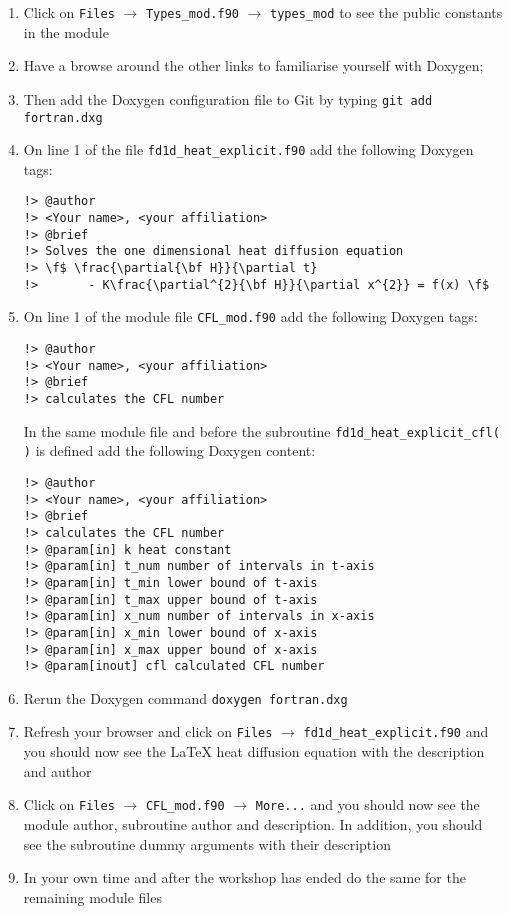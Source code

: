\documentclass[12pt]{article}
\begin{document}
\begin{enumerate}
\begin{enumerate}
\item Click on \texttt{Files} $\rightarrow$ \texttt{Types\_mod.f90} $\rightarrow$ \texttt{types\_mod} to see
the public constants in the module
\item Have a browse around the other links to familiarise yourself with Doxygen;
\item Then add the Doxygen configuration file to Git by typing \texttt{git add fortran.dxg}
\item On line 1 of the file \texttt{fd1d\_heat\_explicit.f90} add the following Doxygen tags:
\begin{verbatim}
!> @author
!> <Your name>, <your affiliation>
!> @brief 
!> Solves the one dimensional heat diffusion equation
!> \f$ \frac{\partial{\bf H}}{\partial t} 
!>       - K\frac{\partial^{2}{\bf H}}{\partial x^{2}} = f(x) \f$
\end{verbatim}
\item On line 1 of the module file \texttt{CFL\_mod.f90} add the following Doxygen tags:
\begin{verbatim}
!> @author
!> <Your name>, <your affiliation>
!> @brief
!> calculates the CFL number
\end{verbatim}
In the same module file and before the subroutine \texttt{fd1d\_heat\_explicit\_cfl( )} is defined add
the following Doxygen content:
\begin{verbatim}
!> @author
!> <Your name>, <your affiliation>
!> @brief
!> calculates the CFL number
!> @param[in] k heat constant
!> @param[in] t_num number of intervals in t-axis
!> @param[in] t_min lower bound of t-axis
!> @param[in] t_max upper bound of t-axis
!> @param[in] x_num number of intervals in x-axis
!> @param[in] x_min lower bound of x-axis
!> @param[in] x_max upper bound of x-axis
!> @param[inout] cfl calculated CFL number
\end{verbatim}
\item Rerun the Doxygen command \texttt{doxygen fortran.dxg}
\item Refresh your browser and click on \texttt{Files} $\rightarrow$ \texttt{fd1d\_heat\_explicit.f90} and you
should now see the LaTeX heat diffusion equation with the description and author
\item Click on \texttt{Files} $\rightarrow$ \texttt{CFL\_mod.f90} $\rightarrow$ \texttt{More...} and you 
should now see the module author, subroutine author and description. In addition, you should see the subroutine
dummy arguments with their description
\item In your own time and after the workshop has ended do the same for the remaining module files 

\end{enumerate}
\end{enumerate}
\end{document}
